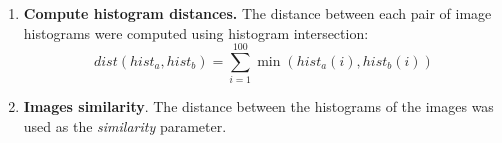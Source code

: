 \documentclass[a4paper,12pt]{article}
\begin{document}
\begin{enumerate}
\begin{figure}[h]
            \label{fig:spechist}
        \end{figure}
    \item \textbf{Compute histogram distances.} The distance between
        each pair of image histograms were computed using histogram intersection:
        \begin{equation}
            dist(hist_a,hist_b) = \sum_{i=1}^{100} \min( hist_a(i), hist_b(i))
        \end{equation}
    \item \textbf{Images similarity}. The distance between the histograms
        of the images was used as the \emph{similarity} parameter. 
\end{enumerate}
\end{document}
